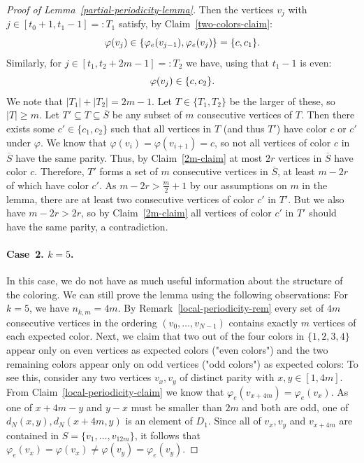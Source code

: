 \documentclass[a4paper,10pt,hidelinks]{amsart}
\renewcommand{\phi}{\ensuremath{\varphi}}
\theoremstyle{definition}
\begin{document}
\begin{proof}[Proof of Lemma~\ref{partial-periodicity-lemma}]
    Then the vertices $v_j$ with $j \in [t_0 + 1, t_1 - 1] =: T_1$ satisfy, by Claim~\ref{two-colors-claim}:
    \begin{equation}\notag
        \varphi(v_j) \in \{\varphi_e(v_{j-1}), \varphi_e(v_j)\} = \{c, c_1\}.
    \end{equation}
    Similarly, for $j \in [t_1, t_2 + 2m - 1] =: T_2$ we have, using that $t_1 - 1$ is even:
    \begin{equation}\notag
        \varphi(v_j) \in \{c, c_2\}.
    \end{equation}
    We note that $|T_1| + |T_2| = 2m-1$. Let $T \in \{T_1, T_2\}$ be the larger of these, so $|T| \geq m$.
    Let $T'\subseteq T \subseteq \overline{S}$ be any subset of $m$ consecutive vertices of $T$. Then there exists some $c'\in \{c_1,c_2\}$ such that all vertices in $T$ (and thus $T'$) have color $c$ or $c'$ under $\phi$. We know that $\varphi(v_i) = \varphi(v_{i+1}) = c$, so not all vertices of color $c$ in $\overline{S}$ have the same parity. Thus, by Claim~\ref{2m-claim} at most $2r$ vertices in $\overline{S}$ have color $c$. Therefore, $T'$ forms a set of $m$ consecutive vertices in $\overline{S}$, at least $m - 2r$ of which have color $c'$. As $m - 2r > \frac{m}{2} + 1$ by our assumptions on $m$ in the lemma, there are at least two consecutive vertices of color $c'$ in $T'$. But we also have $m - 2r > 2r$, so by Claim~\ref{2m-claim} all vertices of color $c'$ in $T'$ should have the same parity, a contradiction.

    \medskip

    \paragraph*{\textbf{Case~2.} $k = 5$.}

    In this case, we do not have as much useful information about the structure of the coloring. We can still prove the lemma using the following observations: For $k=5$, we have $n_{k,m} = 4m$. By Remark~\ref{local-periodicity-rem} every set of $4m$ consecutive vertices in the ordering $(v_0,\ldots,v_{N-1})$ contains exactly $m$ vertices of each expected color. Next, we claim that two out of the four colors in $\{1,2,3,4\}$ appear only on even vertices as expected colors ("even colors") and the two remaining colors appear only on odd vertices ("odd colors") as expected colors: To see this, consider any two vertices $v_x, v_y$ of distinct parity with $x,y \in [1,4m]$. From Claim~\ref{local-periodicity-claim} we know that $\varphi_e(v_{x + 4m}) = \varphi_e(v_{x})$. As one of $x + 4m - y$ and $y - x$ must be smaller than $2m$ and both are odd, one of $d_N(x, y), d_N(x+4m, y)$ is an element of $D_1$. Since all of $v_x, v_y$ and $v_{x+4m}$ are contained in $S=\{v_1,\ldots,v_{12m}\}$, it follows that $\varphi_e(v_x)=\phi(v_x) \neq \phi(v_y)=\varphi_e(v_y)$. 


\end{proof}
\end{document}
